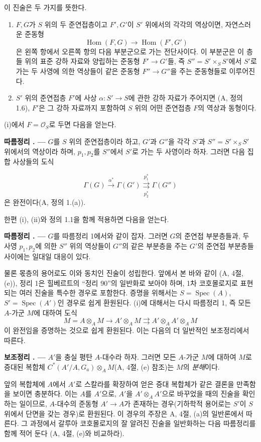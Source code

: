 \documentclass[11pt,twoside,openany]{book}
\numberwithin{equation}{section}
\newcommand{\sourceunit}{front}
\newcommand{\src}[1]{%
  \phantomsection\hypertarget{src:\sourceunit:#1}{}%
  \marginpar{\raggedleft\footnotesize\sffamily #1}%
}
\theoremstyle{plain}
\theoremstyle{definition}
\theoremstyle{remark}
\newcommand{\result}[2]{%
  \par\medskip\noindent\textbf{#1%
  \if\relax\detokenize{#2}\relax\else\space#2\fi. ---}\enspace
}
\begin{document}
이 진술은 두 가지를 뜻한다.
\begin{enumerate}
\item[(i)] $F,G$가 $S$ 위의 두 준연접층이고 $F',G'$이 $S'$ 위에서의
각각의 역상이면, 자연스러운 준동형
\[
  \operatorname{Hom}(F,G)\longrightarrow\operatorname{Hom}(F',G')
\]
은 왼쪽 항에서 오른쪽 항의 다음 부분군으로 가는 전단사이다. 이 부분군은
이 층들 위의 표준 강하 자료와 양립하는 준동형
$F'\longrightarrow G'$들, 즉 $S''=S'\times_SS'$에서 $S'$로 가는 두
사영에 의한 역상들이 같은 준동형 $F''\longrightarrow G''$을 주는
준동형들로 이루어진다.
\item[(ii)] $S'$ 위의 준연접층 $F'$에 사상
$\alpha:S'\longrightarrow S$에 관한 강하 자료가 주어지면
(A, 정의 1.6), $F'$은 그 강하 자료까지 포함하여 $S$ 위의 어떤
준연접층 $F$의 역상과 동형이다.
\end{enumerate}
(i)에서 $F=\mathcal O_S$로 두면 다음을 얻는다.

\result{따름정리}{1} $G$를 $S$ 위의 준연접층이라 하고, $G'$과 $G''$을
각각 $S'$과 $S''=S'\times_SS'$ 위에서의 역상이라 하며, $p_1,p_2$를
$S''$에서 $S'$로 가는 두 사영이라 하자. 그러면 다음 집합 사상들의
도식

\src{316}
\[
  \Gamma(G)\xrightarrow{\alpha^*}\Gamma(G')
  \underset{p_2^*}{\overset{p_1^*}{\rightrightarrows}}\Gamma(G'')
\]
은 완전이다(A, 정의 1.(a)).

한편 (i), (ii)와 정의 1.1을 함께 적용하면 다음을 얻는다.

\result{따름정리}{2} $G$를 따름정리 1에서와 같이 잡자. 그러면 $G$의
준연접 부분층들과, 두 사영 $p_1,p_2$에 의한 $S''$ 위의 역상들이
$G''$의 같은 부분층을 주는 $G'$의 준연접 부분층들 사이에는
일대일 대응이 있다.

물론 몫층의 용어로도 이와 동치인 진술이 성립한다. 앞에서 본 바와 같이
(A, 4절, (e)), 정리 1은 힐베르트의 “정리 90”의 일반화로 보아야 하며,
1차 코호몰로지로 표현되는 여러 진술을 특수한 경우로 포함한다. 증명을
위해서는 $S=\operatorname{Spec}(A)$,
$S'=\operatorname{Spec}(A')$인 경우로 쉽게 환원된다. (i)에 대해서는
다시 따름정리 1, 즉 모든 $A$-가군 $M$에 대하여 도식
\[
  M=A\otimes_A M\longrightarrow A'\otimes_A M
  \rightrightarrows A'\otimes_AA'\otimes_A M
\]
이 완전임을 증명하는 것으로 쉽게 환원된다. 이는 다음의 더 일반적인
보조정리에서 따른다.

\result{보조정리}{1.1} $A'$을 충실 평탄 $A$-대수라 하자. 그러면 모든
$A$-가군 $M$에 대하여 $M$로 증대된 복합체
$C^*(A'/A,G_a)\otimes_A M$(A, 4절, (e) 참조)는 $M$의
\emph{분해}이다.

앞의 복합체에 $A$에서 $A'$로 스칼라를 확장하여 얻은 증대 복합체가
같은 결론을 만족함을 보이면 충분하다. 이는 $A$를 $A'$으로, $A'$을
$A'\otimes_AA'$으로 바꾸었을 때의 진술을 확인하는 일이므로,
$A$-대수의 준동형 $A'\longrightarrow A$가 존재하는 경우(기하학적
용어로는 $S'$이 $S$ 위에서 단면을 갖는 경우)로 환원된다. 이 경우의
주장은 A, 4절, (a)의 일반론에서 따른다. 그 과정에서 갈루아
코호몰로지의 잘 알려진 진술을 일반화하는 다음 따름정리를 함께 적어 둔다
(A, 4절, (e)와 비교하라).
\end{document}
